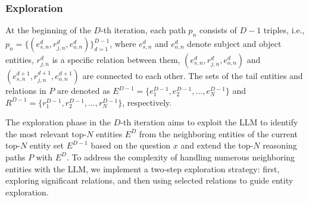 \documentclass{article} %
\begin{document}
\subsubsection{Exploration}
At the beginning of the $D$-th iteration, each path $p_n$ consists of $D-1$ triples, i.e., $p_n =\{(e^d_{s,n}, r^d_{j,n}, e^d_{o,n})\}^{D-1}_{d=1}$, where $e^d_{s,n}$ and $e^d_{o,n}$ denote subject and object entities, $r^d_{j,n}$ is a specific relation between them, $(e^d_{s,n}, r^d_{j,n}, e^d_{o,n})$ and $(e^{d+1}_{s,n}, r^{d+1}_{j,n}, e^{d+1}_{o,n})$ are connected to each other. The sets of the tail entities and relations in $P$ are denoted as $E^{D-1}=\{e^{D-1}_{1},e^{D-1}_{2},...,e^{D-1}_{N}\}$ and $R^{D-1}=\{r^{D-1}_{1},r^{D-1}_{2},...,r^{D-1}_{N}\}$, respectively. 

The exploration phase in the $D$-th iteration aims to exploit the LLM to identify the most relevant top-$N$ entities $E^{D}$ from the neighboring entities of the current top-$N$ entity set $E^{D-1}$ based on the question $x$ and extend the top-$N$ reasoning paths $P$ with $E^{D}$.
To address the complexity of handling numerous neighboring entities with the LLM, we implement a two-step exploration strategy: first, exploring significant relations, and then using selected relations to guide entity exploration.

\end{document}
